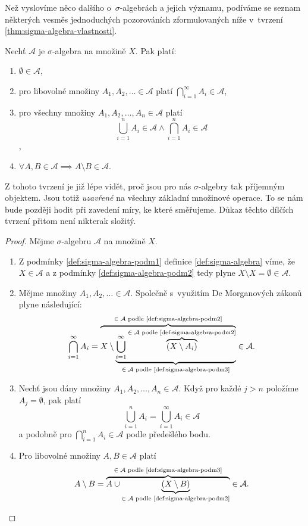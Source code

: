 Než vyslovíme něco dalšího o~$\sigma$-algebrách a jejich významu, podíváme se seznam některých vesměs jednoduchých pozorováních zformulovaných níže v~tvrzení \ref{thm:sigma-algebra-vlastnosti}.
\begin{theorem}\label{thm:sigma-algebra-vlastnosti}
    Nechť $\mathcal{A}$ je $\sigma$-algebra na množině $X$. Pak platí:
    \begin{enumerate}[label=(\roman*)]
        \item $\emptyset\in\mathcal{A}$,
        \item pro libovolné množiny $A_1,A_2,\ldots\in\mathcal{A}$ platí $\bigcap_{i=1}^\infty A_i\in\mathcal{A}$,
        \item pro všechny množiny $A_1,A_2,\ldots,A_n\in\mathcal{A}$ platí
        \[\bigcup_{i=1}^n A_i\in\mathcal{A}\land\bigcap_{i=1}^n A_i\in\mathcal{A}\],
        \item $\forall A,B\in\mathcal{A}\implies A\setminus B\in\mathcal{A}$.
    \end{enumerate}
\end{theorem}

Z tohoto tvrzení je již lépe vidět, proč jsou pro nás $\sigma$-algebry tak příjemným objektem. Jsou totiž \emph{uzavřené} na všechny základní množinové operace. To se nám bude později hodit při zavedení míry, ke které směřujeme. Důkaz těchto dílčích tvrzení přitom není nikterak složitý.
\begin{proof}
    Mějme $\sigma$-algebru $\mathcal{A}$ na množině $X$.
    \begin{enumerate}[label=\textit{(\roman*)}]
        \item Z podmínky \ref{def:sigma-algebra-podm1} definice \ref{def:sigma-algebra} víme, že $X\in\mathcal{A}$ a z podmínky \ref{def:sigma-algebra-podm2} tedy plyne $X\setminus X=\emptyset\in\mathcal{A}$.
        \item Mějme množiny $A_1,A_2,\ldots\in\mathcal{A}$. Společně s~využitím De Morganových zákonů plyne následující:
        \[\bigcap\limits_{i=1}^\infty A_i=\overbrace{X\setminus\underbrace{\bigcup\limits_{i=1}^\infty \overbrace{(X\setminus A_i)}^{\text{$\in\mathcal{A}$ podle \ref{def:sigma-algebra-podm2}}}}_{\text{$\in\mathcal{A}$ podle \ref{def:sigma-algebra-podm3}}}}^\text{$\in\mathcal{A}$ podle \ref{def:sigma-algebra-podm2}}\in\mathcal{A}.\]
        \item Nechť jsou dány množiny $A_1,A_2,\ldots,A_n\in\mathcal{A}$. Když pro každé $j>n$ položíme $A_j=\emptyset$, pak platí
        \[\bigcup\limits_{i=1}^n A_i=\bigcup\limits_{i=1}^\infty A_i\in\mathcal{A}\]
        a podobně pro $\bigcap_{i=1}^n A_i\in\mathcal{A}$ podle předešlého bodu.
        \item Pro libovolné množiny $A,B\in\mathcal{A}$ platí
        \[A\setminus B=\overbrace{A\cup\underbrace{(X\setminus B)}_{\text{$\in\mathcal{A}$ podle \ref{def:sigma-algebra-podm2}}}}^{\text{$\in\mathcal{A}$ podle \ref{def:sigma-algebra-podm3}}}\in\mathcal{A}.\]
    \end{enumerate}
\end{proof}

